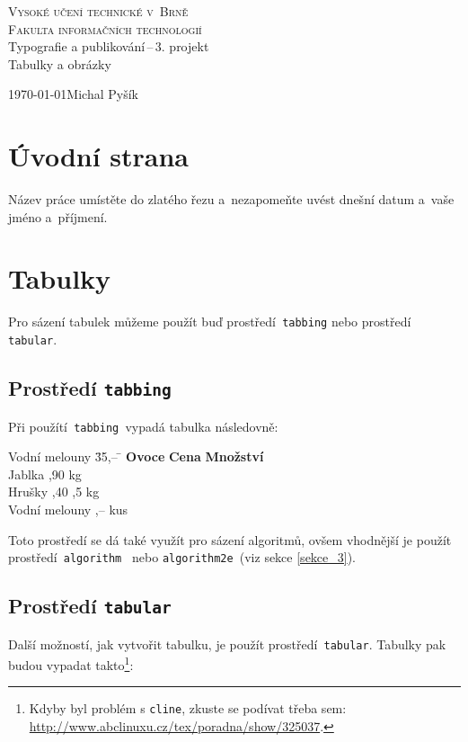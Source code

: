 \documentclass[a4paper, 11pt]{article}
\begin{document}
\begin{titlepage}
\begin{center}
    \textsc{\Huge Vysoké učení technické v~Brně\\ \huge Fakulta informačních technologií\\}
    \LARGE Typografie a publikování\,--\,3. projekt\\
    \Huge Tabulky a obrázky
\end{center}
\Large{\today \hfill Michal Pyšík}
\bigskip
\end{titlepage}


\section{Úvodní strana}
Název práce umístěte do zlatého řezu a~nezapomeňte uvést dnešní datum a~vaše jméno a~příjmení.


\section{Tabulky}
Pro sázení tabulek můžeme použít buď prostředí\verb| tabbing| nebo prostředí\verb| tabular|.

\subsection{Prostředí \texttt{tabbing}}
Při použítí\verb| tabbing |vypadá tabulka následovně:

\begin{tabbing}
    Vodní melouny \quad \= 35,-- \quad \= \kill
    \textbf{Ovoce} \quad \> \textbf{Cena} \> \textbf{Množství} \\
    Jablka ,90  kg \\
    Hrušky ,40 ,5 kg \\
    Vodní melouny ,--  kus \\
\end{tabbing}
Toto prostředí se dá také využít pro sázení algoritmů, ovšem vhodnější je použít prostředí\verb| algorithm |
nebo \verb|algorithm2e |(viz sekce \ref{sekce_3}).

\subsection{Prostředí \texttt{tabular}}
Další možností, jak vytvořit tabulku, je použít prostředí\verb| tabular|. Tabulky pak budou vypadat
takto\footnote{Kdyby byl problém s \texttt{cline}, zkuste se podívat třeba sem: \url{http://www.abclinuxu.cz/tex/poradna/show/325037}.}:
\end{document}
